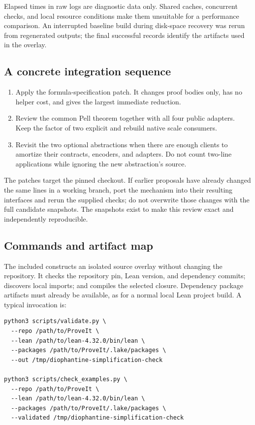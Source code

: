 \documentclass[11pt,a4paper]{article}
\begin{document}
Elapsed times in raw logs are diagnostic data only. Shared caches, concurrent
checks, and local resource conditions make them unsuitable for a performance
comparison. An interrupted baseline build during disk-space recovery was
rerun from regenerated outputs; the final successful records identify the
artifacts used in the overlay.

\subsection{A concrete integration sequence}

\begin{enumerate}
\item Apply the formula-specification patch. It changes proof bodies only,
  has no helper cost, and gives the largest immediate reduction.
\item Review the common Pell theorem together with all four public adapters.
  Keep the factor of two explicit and rebuild native scale consumers.
\item Revisit the two optional abstractions when there are enough clients to
  amortize their contracts, encoders, and adapters. Do not count two-line
  applications while ignoring the new abstraction's source.
\end{enumerate}

The patches target the pinned checkout. If earlier proposals have already
changed the same lines in a working branch, port the mechanism into their
resulting interfaces and rerun the supplied checks; do not overwrite those
changes with the full candidate snapshots. The snapshots exist to make this
review exact and independently reproducible.

\subsection{Commands and artifact map}

The included  constructs an isolated source overlay
without changing the repository. It checks the repository pin, Lean version,
and dependency commits; discovers local imports; and compiles the selected
closure. Dependency package artifacts must already be available, as for a
normal local Lean project build. A typical invocation is:

\begin{lstlisting}[language={}]
python3 scripts/validate.py \
  --repo /path/to/ProveIt \
  --lean /path/to/lean-4.32.0/bin/lean \
  --packages /path/to/ProveIt/.lake/packages \
  --out /tmp/diophantine-simplification-check

python3 scripts/check_examples.py \
  --repo /path/to/ProveIt \
  --lean /path/to/lean-4.32.0/bin/lean \
  --packages /path/to/ProveIt/.lake/packages \
  --validated /tmp/diophantine-simplification-check
\end{lstlisting}
\end{document}
